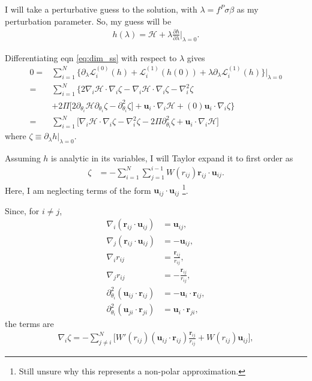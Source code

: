 \documentclass[twocolumn,amsmath,amssymb,aps]{revtex4-1}%
\begin{document}
I will take a perturbative guess to the solution, with $\lambda=f^P\sigma\beta$
as my perturbation parameter. So, my guess will be
\begin{align}\label{eq:hperturb}
  h(\lambda) = \mathcal{H}
  + \lambda\frac{\partial h}{\partial \lambda}\bigg|_{\lambda=0}.
\end{align}

Differentiating eqn \ref{eq:dim_ss} with respect to $\lambda$ gives
\begin{align}\label{eq:first_perturb_DE}
  0
  =&\sum_{i=1}^N\big\{\partial_{\lambda}\mathcal{L}_i^{(0)}(h)
    + \mathcal{L}_i^{(1)}(h(0))
    +\lambda\partial_{\lambda}\mathcal{L}_i^{(1)}
    (h)\big\}\bigg|_{\lambda=0}\nonumber\\
  =&\sum_{i=1}^N\big\{2\nabla_i \mathcal{H}\cdot\nabla_i\zeta
    - \nabla_i\mathcal{H}\cdot\nabla_i\zeta
    -\nabla_i^2\zeta\nonumber\\
    &+2\Pi\big[2\partial_{\theta_i}\mathcal{H}\partial_{\theta_i}\zeta
    -\partial_{\theta_i}^2\zeta\big]
    + \bm{u}_i\cdot\nabla_i\mathcal{H}
    +(0)\bm{u}_i\cdot\nabla_i\zeta\big\}\nonumber\\
  =&\sum_{i=1}^N\big[\nabla_i \mathcal{H}\cdot\nabla_i\zeta
    -\nabla_i^2\zeta - 2\Pi
    \partial_{\theta_i}^2\zeta
    + \bm{u}_i\cdot\nabla_i\mathcal{H}\big]
\end{align}
where $\zeta\equiv\partial_{\lambda}h|_{\lambda=0}$.

Assuming $h$ is analytic in its variables, I will Taylor expand it to
first order as
\begin{align}\label{eq:zetaform}
  \zeta &= -\sum_{i=1}^N\sum_{j=1}^{i-1}
      W(r_{ij})\bm{r}_{ij}\cdot\bm{u}_{ij}.
\end{align}
Here, I am neglecting terms of the form $\bm{u}_{ij}\cdot\bm{u}_{ij}$
\footnote{Still unsure why this represents a non-polar approximation.}.


Since, for $i\neq j$,
\begin{align}
  \nabla_i(\bm{r}_{ij}\cdot\bm{u}_{ij}) &= \bm{u}_{ij},\\
  \nabla_j(\bm{r}_{ij}\cdot\bm{u}_{ij}) &= -\bm{u}_{ij},\\
  \nabla_i r_{ij} &=\frac{\bm{r}_{ij}}{r_{ij}},\\
  \nabla_j r_{ij} &=-\frac{\bm{r}_{ij}}{r_{ij}},\\
  \partial_{\theta_i}^2(\bm{u}_{ij}\cdot\bm{r}_{ij})
  &=-\bm{u}_i\cdot\bm{r}_{ij},\\
  \partial_{\theta_i}^2(\bm{u}_{ji}\cdot\bm{r}_{ji})
  &=\bm{u}_i\cdot\bm{r}_{ji},
\end{align}
the terms are
\begin{align}
  \nabla_{i}\zeta = -\sum_{j\neq i}^N \bigg[W'(r_{ij})
  (\bm{u}_{ij}\cdot\bm{r}_{ij})\frac{\bm{r}_{ij}}{r_{ij}}
  +W(r_{ij})\bm{u}_{ij}\bigg],
\end{align}
\end{document}
